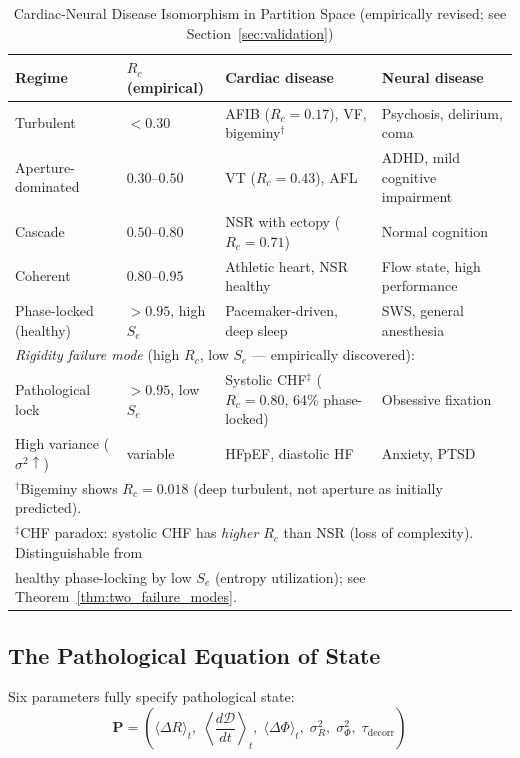 \documentclass[10pt,twocolumn,a4paper]{article}
\theoremstyle{definition}
\begin{document}
\begin{table}[H]
\centering
\caption{Cardiac-Neural Disease Isomorphism in Partition Space
(empirically revised; see Section~\ref{sec:validation})}
\label{tab:disease}
\begin{tabular}{llll}
\toprule
\textbf{Regime} & \textbf{$R_c$ (empirical)} & \textbf{Cardiac disease} & \textbf{Neural disease}\\
\midrule
Turbulent & $< 0.30$ & AFIB ($R_c=0.17$), VF, bigeminy$^\dagger$ & Psychosis, delirium, coma\\
Aperture-dominated & $0.30$--$0.50$ & VT ($R_c=0.43$), AFL & ADHD, mild cognitive impairment\\
Cascade & $0.50$--$0.80$ & NSR with ectopy ($R_c=0.71$) & Normal cognition\\
Coherent & $0.80$--$0.95$ & Athletic heart, NSR healthy & Flow state, high performance\\
Phase-locked (healthy) & $> 0.95$, high $S_e$ & Pacemaker-driven, deep sleep & SWS, general anesthesia\\
\midrule
\multicolumn{4}{l}{\textit{Rigidity failure mode} (high $R_c$, low $S_e$ --- empirically discovered):}\\
Pathological lock & $> 0.95$, low $S_e$ & Systolic CHF$^\ddagger$ ($R_c=0.80$, 64\% phase-locked) & Obsessive fixation\\
High variance ($\sigma^2\uparrow$) & variable & HFpEF, diastolic HF & Anxiety, PTSD\\
\bottomrule
\multicolumn{4}{l}{%
$^\dagger$Bigeminy shows $R_c = 0.018$ (deep turbulent, not aperture as initially predicted).}\\
\multicolumn{4}{l}{%
$^\ddagger$CHF paradox: systolic CHF has \emph{higher} $R_c$ than NSR (loss of complexity).
Distinguishable from}\\
\multicolumn{4}{l}{%
healthy phase-locking by low $S_e$ (entropy utilization); see Theorem~\ref{thm:two_failure_modes}.}\\
\end{tabular}
\end{table}

\subsection{The Pathological Equation of State}

Six parameters fully specify pathological state:
\begin{equation}
\mathbf{P} = \left(\langle\Delta R\rangle_t,\; \left\langle\frac{d\mathcal{D}}{dt}\right\rangle_t,\;
\langle\Delta\Phi\rangle_t,\; \sigma^2_R,\; \sigma^2_\Phi,\; \tau_{\text{decorr}}\right)
\end{equation}
\end{document}
